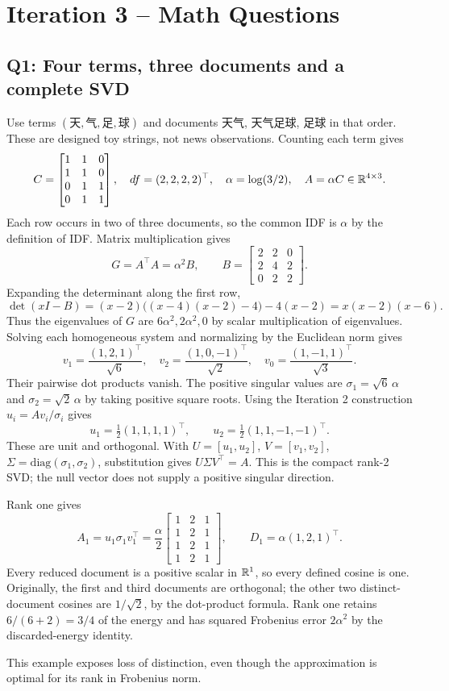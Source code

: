 \section{Iteration 3 -- Math Questions}
\subsection{Q1: Four terms, three documents and a complete SVD}
Use terms $(\text{天},\text{气},\text{足},\text{球})$ and documents
$\text{天气}$, $\text{天气足球}$, $\text{足球}$ in that order.
These are designed toy strings, not news observations.
Counting each term gives
\[
C=\begin{bmatrix}1&1&0\\1&1&0\\0&1&1\\0&1&1\end{bmatrix},
\quad df=(2,2,2,2)^\top,\quad
\alpha=\log(3/2),\quad A=\alpha C\in\mathbb{R}^{4\times3}.
\]
Each row occurs in two of three documents, so the common IDF is $\alpha$ by
the definition of IDF. Matrix multiplication gives
\[
G=A^\top A=\alpha^2 B,\qquad
B=\begin{bmatrix}2&2&0\\2&4&2\\0&2&2\end{bmatrix}.
\]
Expanding the determinant along the first row,
\[
\det(xI-B)=(x-2)\big((x-4)(x-2)-4\big)-4(x-2)
=x(x-2)(x-6).
\]
Thus the eigenvalues of $G$ are $6\alpha^2,2\alpha^2,0$ by scalar
multiplication of eigenvalues. Solving each homogeneous system and
normalizing by the Euclidean norm gives
\[
v_1=\frac{(1,2,1)^\top}{\sqrt6},\quad
v_2=\frac{(1,0,-1)^\top}{\sqrt2},\quad
v_0=\frac{(1,-1,1)^\top}{\sqrt3}.
\]
Their pairwise dot products vanish. The positive singular values are
$\sigma_1=\sqrt6\,\alpha$ and $\sigma_2=\sqrt2\,\alpha$ by taking positive
square roots. Using the Iteration 2 construction $u_i=Av_i/\sigma_i$ gives
\[
u_1=\tfrac12(1,1,1,1)^\top,\qquad
u_2=\tfrac12(1,1,-1,-1)^\top.
\]
These are unit and orthogonal. With $U=[u_1,u_2]$, $V=[v_1,v_2]$,
$\Sigma=\mathrm{diag}(\sigma_1,\sigma_2)$, substitution gives
$U\Sigma V^\top=A$. This is the compact rank-2 SVD; the null vector
does not supply a positive singular direction.

Rank one gives
\[
A_1=u_1\sigma_1v_1^\top
=\frac{\alpha}{2}\begin{bmatrix}1&2&1\\1&2&1\\1&2&1\\1&2&1\end{bmatrix},
\qquad D_1=\alpha(1,2,1)^\top.
\]
Every reduced document is a positive scalar in $\mathbb{R}^1$, so every defined
cosine is one. Originally, the first and third documents are orthogonal;
the other two distinct-document cosines are $1/\sqrt2$, by the dot-product
formula. Rank one retains $6/(6+2)=3/4$ of the energy and has squared
Frobenius error $2\alpha^2$ by the discarded-energy identity.

This example exposes loss of distinction, even though the approximation is
optimal for its rank in Frobenius norm.


